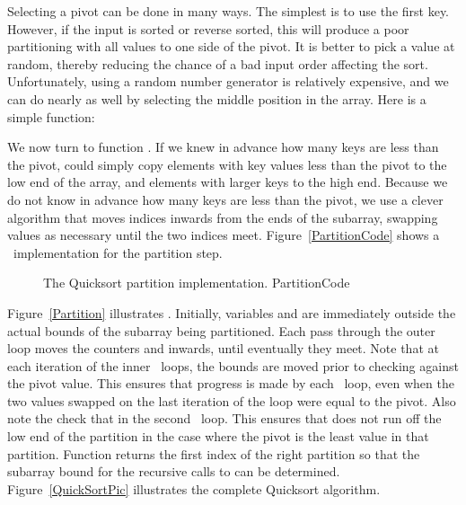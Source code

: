 Selecting a pivot can be done in many ways.
The simplest is to use the first key.
However, if the input is sorted or reverse sorted, this will produce a
poor partitioning with all values to one side of the pivot.
It is better to pick a value at random, thereby reducing the chance of
a bad input order affecting the sort.
Unfortunately, using a random number generator is relatively
expensive, and we can do nearly as well by selecting the middle
position in the array.
Here is a simple  function:


We now turn to function .
If we knew in advance how many keys are less than the pivot,
 could simply copy elements with key values less than
the pivot to the low end of the array, and elements with larger keys
to the high end.
Because we do not know in advance how many keys are less than
the pivot,
we use a clever algorithm that moves indices inwards from the
ends of the subarray, swapping values as necessary until the two
indices meet.
Figure~\ref{PartitionCode} shows a \Lang\ implementation for the
partition step.

\begin{figure}

\vspace{-\bigskipamount}
{The Quicksort partition implementation.}
{PartitionCode}
\end{figure}

Figure~\ref{Partition} illustrates .
Initially, variables  and  are immediately outside the
actual bounds of the subarray being partitioned.
Each pass through the outer  loop moves the counters 
and  inwards, until eventually they meet.
Note that at each iteration of the inner \Cwhile\ loops, the bounds
are moved prior to checking against the pivot value.
This ensures that progress is made by each \Cwhile\ loop, even when
the two values swapped on the last iteration of the  loop
were equal to the pivot.
Also note the check that  in the second \Cwhile\ loop.
This ensures that  does not run off the low end of the
partition in the case where the pivot is the least value in that
partition.
Function  returns the first index of the right
partition so that the subarray bound for the recursive calls to
 can be determined.
Figure~\ref{QuickSortPic} illustrates the complete Quicksort
algorithm.

